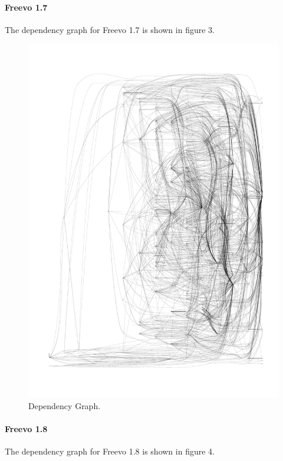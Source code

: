 \documentclass[10.5pt,journal, a4paper]{IEEEtran}
\begin{document}
\paragraph{Freevo 1.7}
\noindent

The dependency graph for Freevo 1.7 is shown in figure 3.

\begin{figure}[H]
 \centering 
 \includegraphics[width=\columnwidth]{17Full}
 \centering 
  \caption {Dependency Graph. }
 \end{figure}


\paragraph{Freevo 1.8}
\noindent
The dependency graph for Freevo 1.8 is shown in figure 4.
\end{document}
